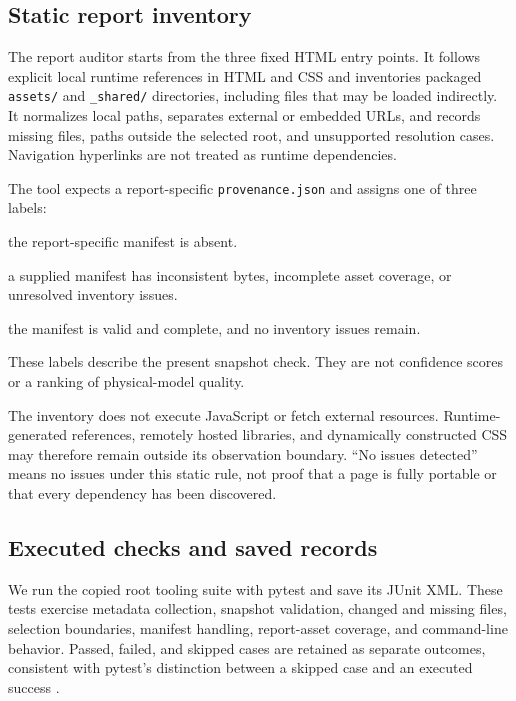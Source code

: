 \documentclass[11pt,a4paper]{article}
\newcommand{\code}[1]{\texttt{#1}}
\begin{document}
\subsection{Static report inventory}
The report auditor starts from the three fixed HTML entry points. It follows explicit local runtime references in HTML and CSS and inventories packaged \code{assets/} and \code{\_shared/} directories, including files that may be loaded indirectly. It normalizes local paths, separates external or embedded URLs, and records missing files, paths outside the selected root, and unsupported resolution cases. Navigation hyperlinks are not treated as runtime dependencies.

The tool expects a report-specific \code{provenance.json} and assigns one of three labels:
\begin{description}[font=\normalfont,leftmargin=0pt]
  \item[\code{legacy\_unverified}:] the report-specific manifest is absent.
  \item[\code{integrity\_failed}:] a supplied manifest has inconsistent bytes, incomplete asset coverage, or unresolved inventory issues.
  \item[\code{snapshot\_verified}:] the manifest is valid and complete, and no inventory issues remain.
\end{description}
These labels describe the present snapshot check. They are not confidence scores or a ranking of physical-model quality.

The inventory does not execute JavaScript or fetch external resources. Runtime-generated references, remotely hosted libraries, and dynamically constructed CSS may therefore remain outside its observation boundary. ``No issues detected'' means no issues under this static rule, not proof that a page is fully portable or that every dependency has been discovered.

\subsection{Executed checks and saved records}
We run the copied root tooling suite with pytest and save its JUnit XML. These tests exercise metadata collection, snapshot validation, changed and missing files, selection boundaries, manifest handling, report-asset coverage, and command-line behavior. Passed, failed, and skipped cases are retained as separate outcomes, consistent with pytest's distinction between a skipped case and an executed success \citep{pytestskip}.
\end{document}
